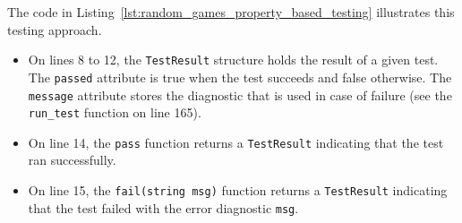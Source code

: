 \documentclass[12pt,a4paper,twoside,openright]{book}
\begin{document}

The code in Listing~\ref{lst:random_games_property_based_testing} illustrates this testing approach.

\begin{itemize}
\item On lines 8 to 12, the \texttt{TestResult} structure holds the result of a given test. The \texttt{passed} attribute is true when the test succeeds and false otherwise. The \texttt{message} attribute stores the diagnostic that is used in case of failure (see the \texttt{run_test} function on line 165).

\item On line 14, the \texttt{pass} function returns a \texttt{TestResult} indicating that the test ran successfully.

\item On line 15, the \texttt{fail(string msg)} function returns a \texttt{TestResult} indicating that the test failed with the error diagnostic \texttt{msg}.


\end{itemize}
\end{document}
